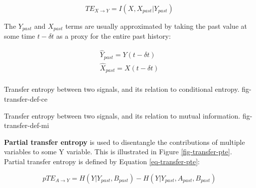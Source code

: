 \begin{equation}
TE_{X \rightarrow Y} = I(X,X_{past}|Y_{past})
\label{eq-transfer-def-mi}
\end{equation}

The $Y_{past}$ and $X_{past}$ terms are usually approximated by taking the
past value at some time $t-\delta t$ as a proxy for the entire past history:

\begin{equation}
\begin{array}{cc}
\hat{Y}_{past} = Y(t - \delta t) \\
\hat{X}_{past} = X(t - \delta t) \\
\end{array}
\label{eq-transfer-past}
\end{equation}

{Transfer entropy between two signals, and its relation to conditional
entropy.}
{fig-transfer-def-ce}

{Transfer entropy between two signals, and its relation to mutual
information.}
{fig-transfer-def-mi}

\clearpage
%
\textbf{Partial transfer entropy} is used to disentangle the contributions
of multiple variables to some Y variable. This is illustrated in
Figure \ref{fig-transfer-pte}. Partial transfer entropy is defined by
Equation \ref{eq-transfer-pte}:

\begin{equation}
pTE_{A \rightarrow Y} = H(Y|Y_{past},B_{past})
- H(Y|Y_{past},A_{past},B_{past})
\label{eq-transfer-pte}
\end{equation}

